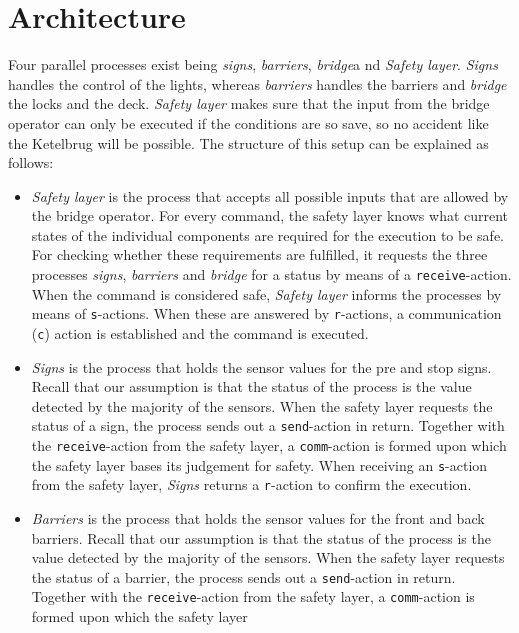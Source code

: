 \section{Architecture}
\label{sec:arch}

Four parallel processes exist being \emph{signs}, \emph{barriers},  \emph{bridge}a nd \emph{Safety layer}. \emph{Signs} handles the control of the lights, whereas \emph{barriers} handles the barriers and \emph{bridge} the locks and the deck. \emph{Safety layer} makes sure that the input from the bridge operator can only be executed if the conditions are so save, so no accident like the Ketelbrug will be possible. The structure of this setup can be explained as follows:
%
\begin{itemize}
	\item \emph{Safety layer} is the process that accepts all possible inputs that are allowed by the bridge operator. For every command, the safety layer knows what current states of the individual components are required for the
	execution to be safe. For checking whether these requirements are fulfilled, it requests the three processes \emph{signs}, \emph{barriers} and \emph{bridge} for a status by means of a \texttt{receive}-action.
	When the command is considered safe, \emph{Safety layer} informs the processes by means of \texttt{s}-actions. When these are answered by \texttt{r}-actions, a communication (\texttt{c}) action is established and the command
	is executed.
	\item \emph{Signs} is the process that holds the sensor values for the pre and stop signs. Recall that our assumption is that the status of the process is the value detected by the majority of the sensors. When the safety layer
	requests the status of a sign, the process sends out a \texttt{send}-action in return. Together with the \texttt{receive}-action from the safety layer, a \texttt{comm}-action is formed upon which the safety layer bases its
	judgement for safety. When receiving an \texttt{s}-action from the safety layer, \emph{Signs} returns a \texttt{r}-action to confirm the execution.
	\item \emph{Barriers} is the process that holds the sensor values for the front and back barriers. Recall that our assumption is that the status of the process is the value detected by the majority of the sensors. When the
	safety layer requests the status of a barrier, the process sends out a \texttt{send}-action in return. Together with the \texttt{receive}-action from the safety layer, a \texttt{comm}-action is formed upon which the safety layer

\end{itemize}
